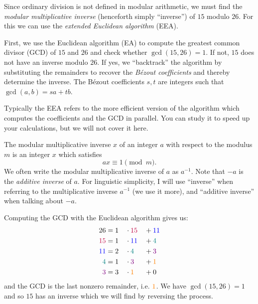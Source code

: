 \documentclass{practice}
\begin{document}
Since ordinary division is not defined in modular arithmetic, we must find the \emph{modular multiplicative inverse} (henceforth simply \enquote{inverse}) of $15$ modulo $26$.
For this we can use the \emph{extended Euclidean algorithm} (EEA).

First, we use the Euclidean algorithm (EA) to compute the greatest common divisor (GCD) of $15$ and $26$ and check whether $\gcd(15, 26)=1$.
If not, $15$ does not have an inverse modulo $26$.
If yes, we \enquote{backtrack} the algorithm by substituting the remainders to recover the \emph{Bézout coefficients} and thereby determine the inverse.
The Bézout coefficients $s, t$ are integers such that $\gcd(a,b) = sa + tb$.

Typically the EEA refers to the more efficient version of the algorithm\footnotemark{} which computes the coefficients and the GCD in parallel.
You can study it to speed up your calculations, but we will not cover it here.
%

\begin{tcolorbox}[title=Modular multiplicative inverse]
  The modular multiplicative inverse $x$ of an integer $a$ with respect to the modulus $m$ is an integer $x$ which satisfies
  \[
    ax \equiv 1 \pmod{m}.
  \]
  We often write the modular multiplicative inverse of $a$ as $a^{-1}$.
  Note that $-a$ is the \emph{additive inverse} of $a$.
  \tcblower
  For linguistic simplicity, I will use \enquote{inverse} when referring to the multiplicative inverse $a^{-1}$ (we use it more), and \enquote{additive inverse} when talking about $-a$.
\end{tcolorbox}

Computing the GCD with the Euclidean algorithm gives us:
\begin{alignat*}{3}
  26 &= 1 &&\cdot {\color{purple}15} &&+ {\color{blue}11}\\
  {\color{purple}15} &= 1 &&\cdot {\color{blue}11} &&+ {\color{teal}4}\\
  {\color{blue}11} &= 2 &&\cdot {\color{teal}4}  &&+ {\color{violet}3}\\
  {\color{teal}4}  &= 1 &&\cdot {\color{violet}3}  &&+ {\color{orange}1}\\
  {\color{violet}3}  &= 3 &&\cdot {\color{orange}1}  &&+ 0
\end{alignat*}
and the GCD is the last nonzero remainder, i.e. $\color{orange}1$.
We have $\gcd(15, 26)=1$ and so $15$ has an inverse which we will find by reversing the process.
\end{document}
